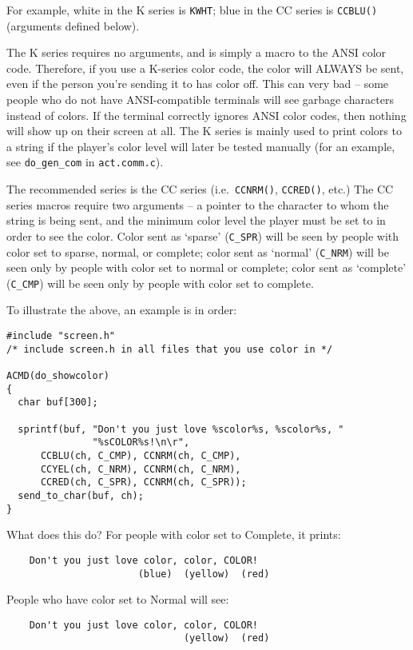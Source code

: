 \documentclass[11pt]{article}
\begin{document}
For example, white in the K series is \texttt{KWHT}; blue in the CC series is \texttt{CCBLU()} (arguments defined below).
\par
The K series requires no arguments, and is simply a macro to the ANSI color code.  Therefore, if you use a K-series color code, the color will ALWAYS be sent, even if the person you're sending it to has color off. This can very bad -- some people who do not have ANSI-compatible terminals will see garbage characters instead of colors.  If the terminal correctly ignores ANSI color codes, then nothing will show up on their screen at all.  The K series is mainly used to print colors to a string if the player's color level will later be tested manually (for an example, see \texttt{do\_gen\_com} in \texttt{act.comm.c}).
\par
The recommended series is the CC series (i.e.\ \texttt{CCNRM()}, \texttt{CCRED()}, etc.) The CC series macros require two arguments -- a pointer to the character to whom the string is being sent, and the minimum color level the player must be set to in order to see the color.  Color sent as `sparse' (\texttt{C\_SPR}) will be seen by people with color set to sparse, normal, or complete;
color sent as `normal' (\texttt{C\_NRM}) will be seen only by people with color set to normal or complete; color sent as `complete' (\texttt{C\_CMP}) will be seen only by people with color set to complete.
\par
To illustrate the above, an example is in order:
\begin{verbatim}
#include "screen.h"
/* include screen.h in all files that you use color in */

ACMD(do_showcolor)
{
  char buf[300];

  sprintf(buf, "Don't you just love %scolor%s, %scolor%s, "
               "%sCOLOR%s!\n\r",
      CCBLU(ch, C_CMP), CCNRM(ch, C_CMP),
      CCYEL(ch, C_NRM), CCNRM(ch, C_NRM),
      CCRED(ch, C_SPR), CCNRM(ch, C_SPR));
  send_to_char(buf, ch);
}
\end{verbatim}
What does this do?  For people with color set to Complete, it prints:
\begin{verbatim}
    Don't you just love color, color, COLOR!
                       (blue)  (yellow)  (red)
\end{verbatim}
People who have color set to Normal will see:
\begin{verbatim}
    Don't you just love color, color, COLOR!
                               (yellow)  (red)
\end{verbatim}
\end{document}
